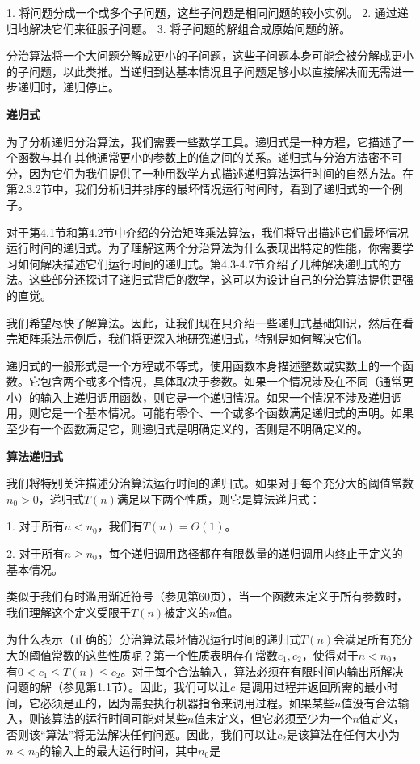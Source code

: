 \documentclass[lang=cn,newtx,10pt,scheme=chinese]{elegantbook}
\begin{document}
1. 将问题分成一个或多个子问题，这些子问题是相同问题的较小实例。
2. 通过递归地解决它们来征服子问题。
3. 将子问题的解组合成原始问题的解。

分治算法将一个大问题分解成更小的子问题，这些子问题本身可能会被分解成更小的子问题，以此类推。当递归到达基本情况且子问题足够小以直接解决而无需进一步递归时，递归停止。

\textbf{递归式}

为了分析递归分治算法，我们需要一些数学工具。递归式是一种方程，它描述了一个函数与其在其他通常更小的参数上的值之间的关系。递归式与分治方法密不可分，因为它们为我们提供了一种用数学方式描述递归算法运行时间的自然方法。在第2.3.2节中，我们分析归并排序的最坏情况运行时间时，看到了递归式的一个例子。

对于第4.1节和第4.2节中介绍的分治矩阵乘法算法，我们将导出描述它们最坏情况运行时间的递归式。为了理解这两个分治算法为什么表现出特定的性能，你需要学习如何解决描述它们运行时间的递归式。第4.3-4.7节介绍了几种解决递归式的方法。这些部分还探讨了递归式背后的数学，这可以为设计自己的分治算法提供更强的直觉。

我们希望尽快了解算法。因此，让我们现在只介绍一些递归式基础知识，然后在看完矩阵乘法示例后，我们将更深入地研究递归式，特别是如何解决它们。

递归式的一般形式是一个方程或不等式，使用函数本身描述整数或实数上的一个函数。它包含两个或多个情况，具体取决于参数。如果一个情况涉及在不同（通常更小）的输入上递归调用函数，则它是一个递归情况。如果一个情况不涉及递归调用，则它是一个基本情况。可能有零个、一个或多个函数满足递归式的声明。如果至少有一个函数满足它，则递归式是明确定义的，否则是不明确定义的。

\textbf{算法递归式}

我们将特别关注描述分治算法运行时间的递归式。如果对于每个充分大的阈值常数$n_0>0$，递归式$T(n)$满足以下两个性质，则它是算法递归式：

1. 对于所有$n<n_0$，我们有$T(n)=\Theta(1)$。

2. 对于所有$n \geq n_0$，每个递归调用路径都在有限数量的递归调用内终止于定义的基本情况。

类似于我们有时滥用渐近符号（参见第60页），当一个函数未定义于所有参数时，我们理解这个定义受限于$T(n)$被定义的$n$值。

为什么表示（正确的）分治算法最坏情况运行时间的递归式$T(n)$会满足所有充分大的阈值常数的这些性质呢？第一个性质表明存在常数$c_1, c_2$，使得对于$n<n_0$，有$0<c_1 \leq T(n) \leq c_2$。对于每个合法输入，算法必须在有限时间内输出所解决问题的解（参见第1.1节）。因此，我们可以让$c_1$是调用过程并返回所需的最小时间，它必须是正的，因为需要执行机器指令来调用过程。如果某些$n$值没有合法输入，则该算法的运行时间可能对某些$n$值未定义，但它必须至少为一个$n$值定义，否则该“算法”将无法解决任何问题。因此，我们可以让$c_2$是该算法在任何大小为$n<n_0$的输入上的最大运行时间，其中$n_0$是
\end{document}

